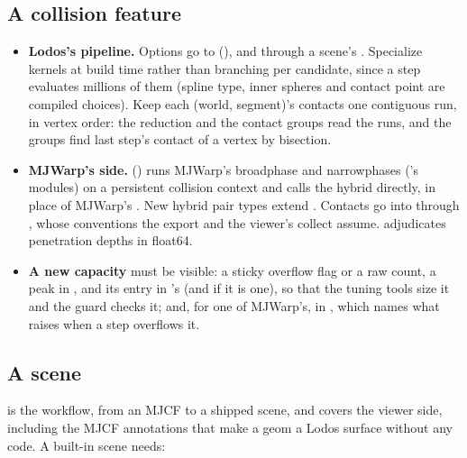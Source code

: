 \subsection{A collision feature}\label{sec:addcol}

\begin{itemize}
\item \textbf{Lodos's pipeline.} Options go to  (), and through a scene's . Specialize kernels at build time rather than branching per candidate, since a step evaluates millions of them (spline type, inner spheres and contact point are compiled choices). Keep each (world, segment)'s contacts one contiguous run, in vertex order: the reduction and the contact groups read the runs, and the groups find last step's contact of a vertex by bisection.
\item \textbf{MJWarp's side.}  () runs MJWarp's broadphase and narrowphases ('s  modules) on a persistent collision context and calls the hybrid directly, in place of MJWarp's . New hybrid pair types extend . Contacts go into  through , whose conventions the export and the viewer's collect assume.  adjudicates penetration depths in float64.
\item \textbf{A new capacity} must be visible: a sticky overflow flag or a raw count, a peak in , and its entry in 's  (and  if it is one), so that the tuning tools size it and the guard checks it; and, for one of MJWarp's,  in , which names what  raises when a step overflows it.
\end{itemize}

\subsection{A scene}\label{sec:addscene}

 is the workflow, from an MJCF to a shipped scene, and  covers the viewer side, including the  MJCF annotations that make a geom a Lodos surface without any code. A built-in scene needs:

